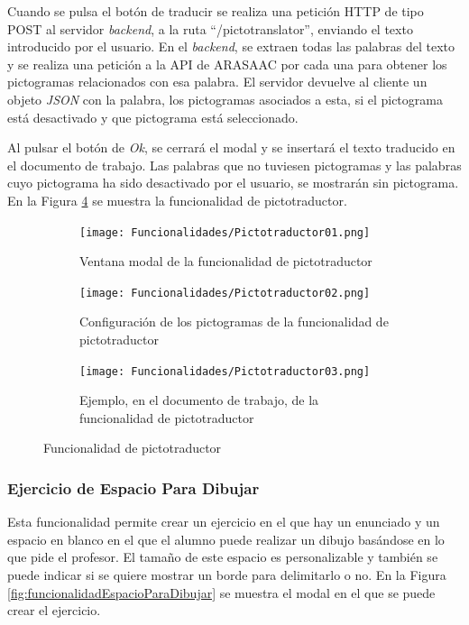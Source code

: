 Cuando se pulsa el botón de traducir se realiza una petición HTTP de tipo POST al servidor \textit{backend}, a la ruta ``/pictotranslator'', enviando el texto introducido por el usuario. En el \textit{backend}, se extraen todas las palabras del texto y se realiza una petición a la API de ARASAAC por cada una para obtener los pictogramas relacionados con esa palabra. El servidor devuelve al cliente un objeto \textit{JSON} con la palabra, los pictogramas asociados a esta, si el pictograma está desactivado y que pictograma está seleccionado.

Al pulsar el botón de \textit{Ok}, se cerrará el modal y se insertará el texto traducido en el documento de trabajo. Las palabras que no tuviesen pictogramas y las palabras cuyo pictograma ha sido desactivado por el usuario, se mostrarán sin pictograma. En la Figura \ref{fig:imppictotraductor} se muestra la funcionalidad de pictotraductor.

\begin{figure}[ht!]
  \centering
  \begin{subfigure}{\textwidth}
    \centering
    \texttt{[image: Funcionalidades/Pictotraductor01.png]}
    \caption{Ventana modal de la funcionalidad de pictotraductor}
    \label{fig:imppictotraductor01}
  \end{subfigure}

  \begin{subfigure}{\textwidth}
    \centering
    \texttt{[image: Funcionalidades/Pictotraductor02.png]}
    \caption{Configuración de los pictogramas de la funcionalidad de pictotraductor}
    \label{fig:imppictotraductor02}
  \end{subfigure}

  \begin{subfigure}{\textwidth}
    \centering
    \texttt{[image: Funcionalidades/Pictotraductor03.png]}
    \caption{Ejemplo, en el documento de trabajo, de la funcionalidad de pictotraductor}
    \label{fig:imppictotraductor03}
  \end{subfigure}

  \caption{Funcionalidad de pictotraductor}
  \label{fig:imppictotraductor}
\end{figure}


\subsubsection{Ejercicio de Espacio Para Dibujar}
\label{sec:impespacioparadibujar}
Esta funcionalidad permite crear un ejercicio en el que hay un enunciado y un espacio en blanco en el que el alumno puede realizar un dibujo basándose en lo que pide el profesor. El tamaño de este espacio es personalizable y también se puede indicar si se quiere mostrar un borde para delimitarlo o no. En la Figura \ref{fig:funcionalidadEspacioParaDibujar} se muestra el modal en el que se puede crear el ejercicio.

